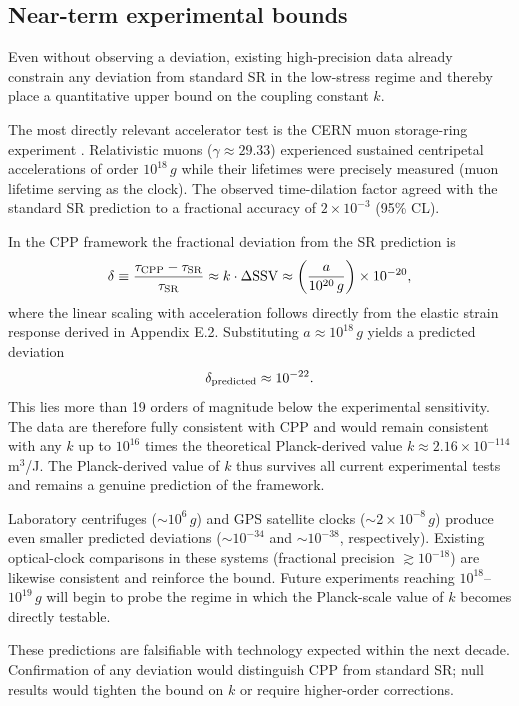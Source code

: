 \documentclass[11pt,letterpaper]{article}
\begin{document}
\subsection{Near-term experimental bounds}  
Even without observing a deviation, existing high-precision data already constrain any deviation from standard SR in the low-stress regime and thereby place a quantitative upper bound on the coupling constant \(k\).

The most directly relevant accelerator test is the CERN muon storage-ring experiment \cite{bailey1977}. Relativistic muons (\(\gamma \approx 29.33\)) experienced sustained centripetal accelerations of order \(10^{18}\,g\) while their lifetimes were precisely measured (muon lifetime serving as the clock). The observed time-dilation factor agreed with the standard SR prediction to a fractional accuracy of \(2 \times 10^{-3}\) (95\% CL).

In the CPP framework the fractional deviation from the SR prediction is
\[
\delta \equiv \frac{\tau_{\rm CPP} - \tau_{\rm SR}}{\tau_{\rm SR}} \approx k \cdot \Delta{\rm SSV} \approx \left( \frac{a}{10^{20}\,g} \right) \times 10^{-20},
\]
where the linear scaling with acceleration follows directly from the elastic strain response derived in Appendix E.2. Substituting \(a \approx 10^{18}\,g\) yields a predicted deviation
\[
\delta_{\rm predicted} \approx 10^{-22}.
\]
This lies more than 19 orders of magnitude below the experimental sensitivity. The data are therefore fully consistent with CPP and would remain consistent with any \(k\) up to \(10^{16}\) times the theoretical Planck-derived value \(k \approx 2.16 \times 10^{-114}\) m\(^3\)/J. The Planck-derived value of \(k\) thus survives all current experimental tests and remains a genuine prediction of the framework.

Laboratory centrifuges (\(\sim 10^6\,g\)) and GPS satellite clocks (\(\sim 2 \times 10^{-8}\,g\)) produce even smaller predicted deviations (\(\sim 10^{-34}\) and \(\sim 10^{-38}\), respectively). Existing optical-clock comparisons in these systems (fractional precision \(\gtrsim 10^{-18}\)) are likewise consistent and reinforce the bound. Future experiments reaching \(10^{18}\)--\(10^{19}\,g\) will begin to probe the regime in which the Planck-scale value of \(k\) becomes directly testable.

These predictions are falsifiable with technology expected within the next decade. Confirmation of any deviation would distinguish CPP from standard SR; null results would tighten the bound on \(k\) or require higher-order corrections.
\end{document}
